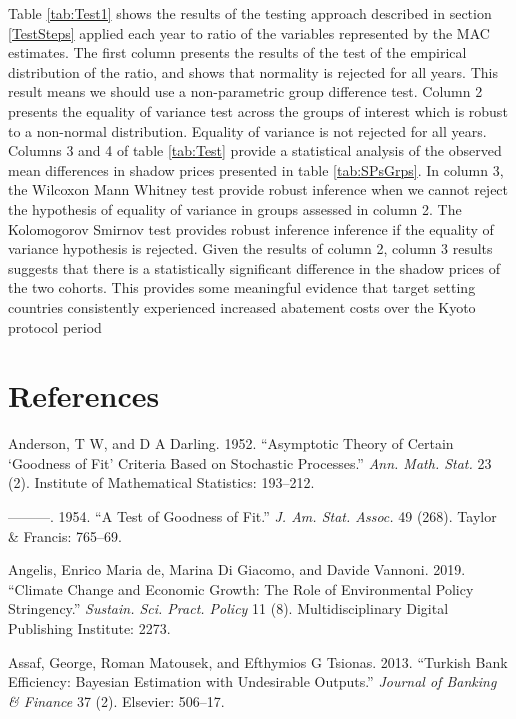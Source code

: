 \documentclass[12pt,]{article}
\begin{document}
Table \ref{tab:Test1} shows the results of the testing approach described in section \ref{TestSteps} applied each year to ratio of the variables represented by the MAC estimates. The first column presents the results of the test of the empirical distribution of the ratio, and shows that normality is rejected for all years. This result means we should use a non-parametric group difference test. Column 2 presents the equality of variance test across the groups of interest which is robust to a non-normal distribution. Equality of variance is not rejected for all years. Columns 3 and 4 of table \ref{tab:Test} provide a statistical analysis of the observed mean differences in shadow prices presented in table \ref{tab:SPsGrps}. In column 3, the Wilcoxon Mann Whitney test provide robust inference when we cannot reject the hypothesis of equality of variance in groups assessed in column 2. The Kolomogorov Smirnov test provides robust inference inference if the equality of variance hypothesis is rejected. Given the results of column 2, column 3 results suggests that there is a statistically significant difference in the shadow prices of the two cohorts. This provides some meaningful evidence that target setting countries consistently experienced increased abatement costs over the Kyoto protocol period

\hypertarget{references}{%
\section*{References}\label{references}}

\hypertarget{refs}{}
\leavevmode\hypertarget{ref-Anderson1952}{}%
Anderson, T W, and D A Darling. 1952. ``Asymptotic Theory of Certain `Goodness of Fit' Criteria Based on Stochastic Processes.'' \emph{Ann. Math. Stat.} 23 (2). Institute of Mathematical Statistics: 193--212.

\leavevmode\hypertarget{ref-Anderson1954}{}%
---------. 1954. ``A Test of Goodness of Fit.'' \emph{J. Am. Stat. Assoc.} 49 (268). Taylor \& Francis: 765--69.

\leavevmode\hypertarget{ref-De_Angelis2019}{}%
Angelis, Enrico Maria de, Marina Di Giacomo, and Davide Vannoni. 2019. ``Climate Change and Economic Growth: The Role of Environmental Policy Stringency.'' \emph{Sustain. Sci. Pract. Policy} 11 (8). Multidisciplinary Digital Publishing Institute: 2273.

\leavevmode\hypertarget{ref-Assaf2013}{}%
Assaf, George, Roman Matousek, and Efthymios G Tsionas. 2013. ``Turkish Bank Efficiency: Bayesian Estimation with Undesirable Outputs.'' \emph{Journal of Banking \& Finance} 37 (2). Elsevier: 506--17.
\end{document}
